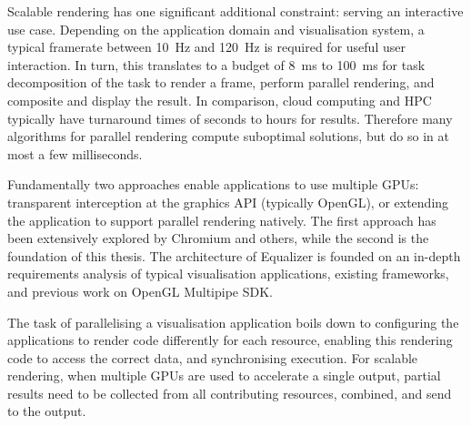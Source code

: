 Scalable rendering has one significant additional constraint: serving
an interactive use case. Depending on the application domain and visualisation
system, a typical framerate between 10~Hz and 120~Hz is required for
useful user interaction. In turn, this translates to a budget of 8~ms to
100~ms for task decomposition of the task to render a frame, perform parallel rendering,
and composite and display the result. In comparison, cloud computing and
HPC typically have turnaround times of seconds to hours for results. Therefore many
algorithms for parallel rendering compute suboptimal solutions,
but do so in at most a few milliseconds.

Fundamentally two approaches enable applications to use multiple
GPUs: transparent interception at the graphics API (typically OpenGL), or
extending the application to support parallel rendering natively. The first
approach has been extensively explored by Chromium and others, while the second
is the foundation of this thesis. The architecture of Equalizer is founded on
an in-depth requirements analysis of typical visualisation applications,
existing frameworks, and previous work on OpenGL Multipipe SDK.

The task of parallelising a visualisation application boils down to configuring
the applications to render code differently for each resource, enabling this
rendering code to access the correct data, and synchronising execution. For
scalable rendering, when multiple GPUs are used to accelerate a single output,
partial results need to be collected from all contributing resources, combined,
and send to the output.


